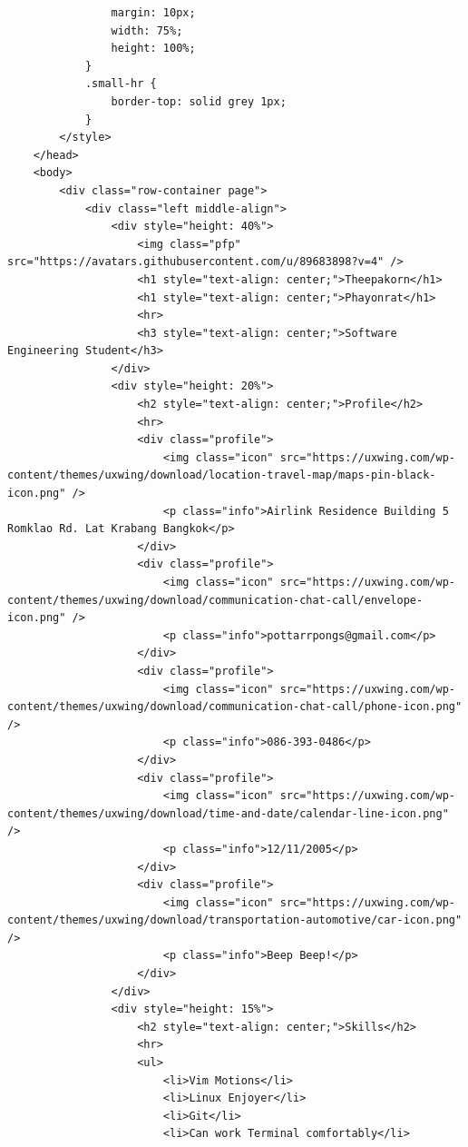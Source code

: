 \documentclass[12pt]{report} %
\begin{document}
\begin{verbatim}
                margin: 10px;
                width: 75%;
                height: 100%;
            }
            .small-hr {
                border-top: solid grey 1px;
            }
        </style>
    </head>
    <body>
        <div class="row-container page">
            <div class="left middle-align">
                <div style="height: 40%">
                    <img class="pfp" src="https://avatars.githubusercontent.com/u/89683898?v=4" />
                    <h1 style="text-align: center;">Theepakorn</h1>
                    <h1 style="text-align: center;">Phayonrat</h1>
                    <hr>
                    <h3 style="text-align: center;">Software Engineering Student</h3>
                </div>
                <div style="height: 20%">
                    <h2 style="text-align: center;">Profile</h2>
                    <hr>
                    <div class="profile">
                        <img class="icon" src="https://uxwing.com/wp-content/themes/uxwing/download/location-travel-map/maps-pin-black-icon.png" />
                        <p class="info">Airlink Residence Building 5 Romklao Rd. Lat Krabang Bangkok</p>
                    </div>
                    <div class="profile">
                        <img class="icon" src="https://uxwing.com/wp-content/themes/uxwing/download/communication-chat-call/envelope-icon.png" />
                        <p class="info">pottarrpongs@gmail.com</p>
                    </div>
                    <div class="profile">
                        <img class="icon" src="https://uxwing.com/wp-content/themes/uxwing/download/communication-chat-call/phone-icon.png" />
                        <p class="info">086-393-0486</p>
                    </div>
                    <div class="profile">
                        <img class="icon" src="https://uxwing.com/wp-content/themes/uxwing/download/time-and-date/calendar-line-icon.png" />
                        <p class="info">12/11/2005</p>
                    </div>
                    <div class="profile">
                        <img class="icon" src="https://uxwing.com/wp-content/themes/uxwing/download/transportation-automotive/car-icon.png" />
                        <p class="info">Beep Beep!</p>
                    </div>
                </div>
                <div style="height: 15%">
                    <h2 style="text-align: center;">Skills</h2>
                    <hr>
                    <ul>
                        <li>Vim Motions</li>
                        <li>Linux Enjoyer</li>
                        <li>Git</li>
                        <li>Can work Terminal comfortably</li>

\end{verbatim}
\end{document}
